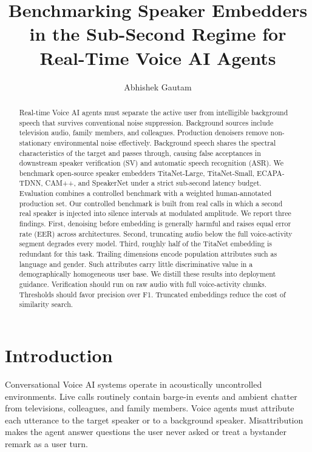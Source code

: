 \documentclass{llncs}
\begin{document}
\title{Benchmarking Speaker Embedders in the Sub-Second Regime for Real-Time Voice AI Agents}

\author{Abhishek Gautam}

\maketitle

\begin{abstract}
Real-time Voice AI agents must separate the active user from intelligible background speech that survives conventional noise suppression. Background sources include television audio, family members, and colleagues. Production denoisers remove non-stationary environmental noise effectively. Background speech shares the spectral characteristics of the target and passes through, causing false acceptances in downstream speaker verification (SV) and automatic speech recognition (ASR). We benchmark open-source speaker embedders TitaNet-Large, TitaNet-Small, ECAPA-TDNN, CAM++, and SpeakerNet under a strict sub-second latency budget. Evaluation combines a controlled benchmark with a weighted human-annotated production set. Our controlled benchmark is built from real calls in which a second real speaker is injected into silence intervals at modulated amplitude. We report three findings. First, denoising before embedding is generally harmful and raises equal error rate (EER) across architectures. Second, truncating audio below the full voice-activity segment degrades every model. Third, roughly half of the TitaNet embedding is redundant for this task. Trailing dimensions encode population attributes such as language and gender. Such attributes carry little discriminative value in a demographically homogeneous user base. We distill these results into deployment guidance. Verification should run on raw audio with full voice-activity chunks. Thresholds should favor precision over F1. Truncated embeddings reduce the cost of similarity search.
\end{abstract}

\section{Introduction}\label{sec:introduction}
Conversational Voice AI systems operate in acoustically uncontrolled environments. Live calls routinely contain barge-in events and ambient chatter from televisions, colleagues, and family members. Voice agents must attribute each utterance to the target speaker or to a background speaker. Misattribution makes the agent answer questions the user never asked or treat a bystander remark as a user turn.
\end{document}
